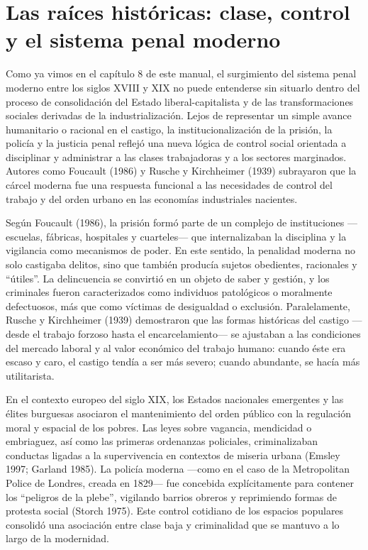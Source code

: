 \documentclass[
  spanish,
  letterpaper,
  DIV=11,
  numbers=noendperiod]{scrreprt}
\begin{document}
\section{Las raíces históricas: clase, control y el sistema penal
moderno}\label{las-rauxedces-histuxf3ricas-clase-control-y-el-sistema-penal-moderno}

Como ya vimos en el capítulo 8 de este manual, el surgimiento del
sistema penal moderno entre los siglos XVIII y XIX no puede entenderse
sin situarlo dentro del proceso de consolidación del Estado
liberal-capitalista y de las transformaciones sociales derivadas de la
industrialización. Lejos de representar un simple avance humanitario o
racional en el castigo, la institucionalización de la prisión, la
policía y la justicia penal reflejó una nueva lógica de control social
orientada a disciplinar y administrar a las clases trabajadoras y a los
sectores marginados. Autores como Foucault (1986) y Rusche y Kirchheimer
(1939) subrayaron que la cárcel moderna fue una respuesta funcional a
las necesidades de control del trabajo y del orden urbano en las
economías industriales nacientes.

Según Foucault (1986), la prisión formó parte de un complejo de
instituciones ---escuelas, fábricas, hospitales y cuarteles--- que
internalizaban la disciplina y la vigilancia como mecanismos de poder.
En este sentido, la penalidad moderna no solo castigaba delitos, sino
que también producía sujetos obedientes, racionales y ``útiles''. La
delincuencia se convirtió en un objeto de saber y gestión, y los
criminales fueron caracterizados como individuos patológicos o
moralmente defectuosos, más que como víctimas de desigualdad o
exclusión. Paralelamente, Rusche y Kirchheimer (1939) demostraron que
las formas históricas del castigo ---desde el trabajo forzoso hasta el
encarcelamiento--- se ajustaban a las condiciones del mercado laboral y
al valor económico del trabajo humano: cuando éste era escaso y caro, el
castigo tendía a ser más severo; cuando abundante, se hacía más
utilitarista.

En el contexto europeo del siglo XIX, los Estados nacionales emergentes
y las élites burguesas asociaron el mantenimiento del orden público con
la regulación moral y espacial de los pobres. Las leyes sobre vagancia,
mendicidad o embriaguez, así como las primeras ordenanzas policiales,
criminalizaban conductas ligadas a la supervivencia en contextos de
miseria urbana (Emsley 1997; Garland 1985). La policía moderna ---como
en el caso de la Metropolitan Police de Londres, creada en 1829--- fue
concebida explícitamente para contener los ``peligros de la plebe'',
vigilando barrios obreros y reprimiendo formas de protesta social
(Storch 1975). Este control cotidiano de los espacios populares
consolidó una asociación entre clase baja y criminalidad que se mantuvo
a lo largo de la modernidad.
\end{document}

